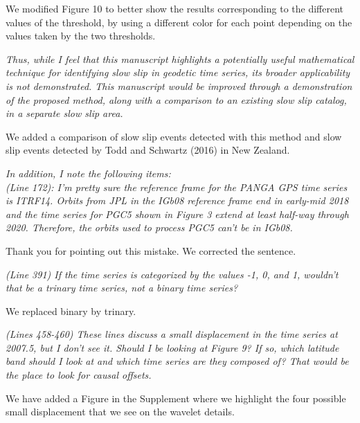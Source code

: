 \documentclass[letterpaper, 12pt]{article}
\begin{document}
\bigskip

We modified Figure 10 to better show the results corresponding to the different values of the threshold, by using a different color for each point depending on the values taken by the two thresholds.

\bigskip

\textit{Thus, while I feel that this manuscript highlights a potentially useful mathematical technique for identifying slow slip in geodetic time series, its broader applicability is not demonstrated. This manuscript would be improved through a demonstration of the proposed method, along with a comparison to an existing slow slip catalog, in a separate slow slip area.}

\bigskip

We added a comparison of slow slip events detected with this method and slow slip events detected by Todd and Schwartz (2016) in New Zealand.

\bigskip

\textit{In addition, I note the following items:} \\

\textit{(Line 172): I'm pretty sure the reference frame for the PANGA GPS time series is ITRF14. Orbits from JPL in the IGb08 reference frame end in early-mid 2018 and the time series for PGC5 shown in Figure 3 extend at least half-way through 2020. Therefore, the orbits used to process PGC5 can't be in IGb08.}

\bigskip

Thank you for pointing out this mistake. We corrected the sentence.

\bigskip

\textit{(Line 391) If the time series is categorized by the values -1, 0, and 1, wouldn't that be a trinary time series, not a binary time series?}

\bigskip
 
We replaced binary by trinary.

\bigskip

\textit{(Lines 458-460) These lines discuss a small displacement in the time series at 2007.5, but I don't see it. Should I be looking at Figure 9? If so, which latitude band should I look at and which time series are they composed of? That would be the place to look for causal offsets.}

\bigskip

We have added a Figure in the Supplement where we highlight the four possible small displacement that we see on the wavelet details.
\end{document}
